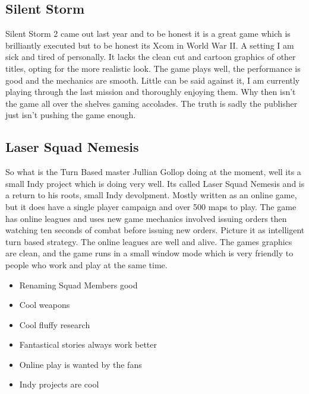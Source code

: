 \documentclass[a4paper]{article}
\begin{document}
\subsection{Silent Storm}
Silent Storm 2 came out last year and to be honest it is a great game which is brilliantly executed but to be honest its Xcom in World War II. A setting I am sick and tired of personally. It lacks the clean cut and cartoon graphics of other titles, opting for the more realistic look. The game plays well, the performance is good and the mechanics are smooth. Little can be said against it, I am currently playing through the last mission and thoroughly enjoying them. Why then isn't the game all over the shelves gaming accolades. The truth is sadly the publisher just isn't pushing the game enough.

\subsection{Laser Squad Nemesis}
So what is the Turn Based master Jullian Gollop doing at the moment, well its a small Indy project which is doing very well. Its called Laser Squad Nemesis and is a return to his roots, small Indy devolpment. Mostly written as an online game, but it does have a single player campaign and over 500 maps to play. The game has online leagues and uses new game mechanics involved issuing orders then watching ten seconds of combat before issuing new orders. Picture it as intelligent turn based strategy. The online leagues are well and alive. The games graphics are clean, and the game runs in a small window mode which is very friendly to people who work and play at the same time.
\begin{itemize}
\item Renaming Squad Members good
\item Cool weapons
\item Cool fluffy research
\item Fantastical stories always work better
\item Online play is wanted by the fans
\item Indy projects are cool
\end{itemize}

\onecolumn
\end{document}
